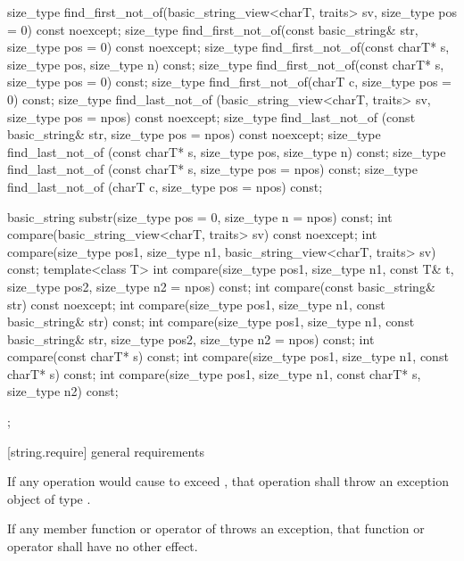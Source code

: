 \begin{codeblock}
{{    size_type find_first_not_of(basic_string_view<charT, traits> sv,
                                size_type pos = 0) const noexcept;
    size_type find_first_not_of(const basic_string& str,
                                size_type pos = 0) const noexcept;
    size_type find_first_not_of(const charT* s, size_type pos,
                                size_type n) const;
    size_type find_first_not_of(const charT* s, size_type pos = 0) const;
    size_type find_first_not_of(charT c, size_type pos = 0) const;
    size_type find_last_not_of (basic_string_view<charT, traits> sv,
                                size_type pos = npos) const noexcept;
    size_type find_last_not_of (const basic_string& str,
                                size_type pos = npos) const noexcept;
    size_type find_last_not_of (const charT* s, size_type pos,
                                size_type n) const;
    size_type find_last_not_of (const charT* s,
                                size_type pos = npos) const;
    size_type find_last_not_of (charT c, size_type pos = npos) const;

    basic_string substr(size_type pos = 0, size_type n = npos) const;
    int compare(basic_string_view<charT, traits> sv) const noexcept;
    int compare(size_type pos1, size_type n1,
                basic_string_view<charT, traits> sv) const;
    template<class T>
      int compare(size_type pos1, size_type n1, const T& t,
                  size_type pos2, size_type n2 = npos) const;
    int compare(const basic_string& str) const noexcept;
    int compare(size_type pos1, size_type n1,
                const basic_string& str) const;
    int compare(size_type pos1, size_type n1,
                const basic_string& str,
                size_type pos2, size_type n2 = npos) const;
    int compare(const charT* s) const;
    int compare(size_type pos1, size_type n1,
                const charT* s) const;
    int compare(size_type pos1, size_type n1,
                const charT* s, size_type n2) const;
  };
}
\end{codeblock}

[string.require]{ general requirements}

\pnum
If any operation would cause  to
exceed , that operation shall throw an
exception object of type .

\pnum
If any member function or operator of  throws an exception, that
function or operator shall have no other effect.


